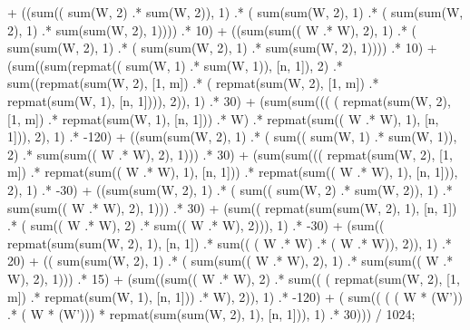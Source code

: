 \documentclass[]{article}
\begin{document}
              + ((sum(( sum(W, 2) .* sum(W, 2)), 1)  .* ( sum(sum(W, 2), 1) .* ( sum(sum(W, 2), 1) .* sum(sum(W, 2), 1))))  .* 10)  
              + ((sum(sum(( W .* W), 2), 1)  .* ( sum(sum(W, 2), 1) .* ( sum(sum(W, 2), 1) .* sum(sum(W, 2), 1))))  .* 10)  
              + (sum((sum(repmat(( sum(W, 1) .* sum(W, 1)), [n, 1]), 2)  .* sum((repmat(sum(W, 2), [1, m])  .* ( repmat(sum(W, 2), [1, m]) .* repmat(sum(W, 1), [n, 1]))), 2)), 1)  .* 30)  
              + (sum(sum((( ( repmat(sum(W, 2), [1, m]) .* repmat(sum(W, 1), [n, 1])) .* W)  .* repmat(sum(( W .* W), 1), [n, 1])), 2), 1)  .* -120)  
              + ((sum(sum(W, 2), 1)  .* ( sum(( sum(W, 1) .* sum(W, 1)), 2) .* sum(sum(( W .* W), 2), 1)))  .* 30)  
              + (sum(sum((( repmat(sum(W, 2), [1, m]) .* repmat(sum(( W .* W), 1), [n, 1]))  .* repmat(sum(( W .* W), 1), [n, 1])), 2), 1)  .* -30)  
              + ((sum(sum(W, 2), 1)  .* ( sum(( sum(W, 2) .* sum(W, 2)), 1) .* sum(sum(( W .* W), 2), 1)))  .* 30)  
              + (sum(( repmat(sum(sum(W, 2), 1), [n, 1]) .* ( sum(( W .* W), 2) .* sum(( W .* W), 2))), 1)  .* -30)  
              + (sum(( repmat(sum(sum(W, 2), 1), [n, 1]) .* sum(( ( W .* W) .* ( W .* W)), 2)), 1)  .* 20)  
              + (( sum(sum(W, 2), 1) .* ( sum(sum(( W .* W), 2), 1) .* sum(sum(( W .* W), 2), 1)))  .* 15)  
              + (sum((sum(( W .* W), 2)  .* sum(( ( repmat(sum(W, 2), [1, m]) .* repmat(sum(W, 1), [n, 1])) .* W), 2)), 1)  .* -120)  + ( sum(( ( ( W * (W')) .* ( W * (W'))) * repmat(sum(sum(W, 2), 1), [n, 1])), 1) .* 30))) / 1024; 
\end{document}
